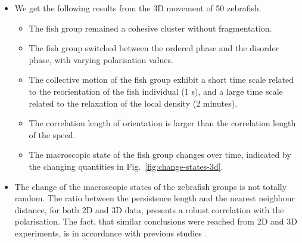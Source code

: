 \documentclass[11pt,twoside]{report}
\begin{document}
\begin{adjustwidth}{-5cm}{0cm}
\begin{tcolorbox}[
fonttitle=\sffamily\Large,
right=0.05\linewidth,
title=Summary of Chapter~5
]
\begin{itemize}
\begin{itemize}
		\item The macroscopic state of the fish group changes over time, indicated by the changing quantities in Fig.~\ref{fig:change-states-2d}.
	\end{itemize}
	\item  We get the following results from the 3D movement of 50 zebrafish.
	\begin{itemize}
		\item The fish group remained a cohesive cluster without fragmentation.
		\item The fish group switched between the ordered phase and the disorder phase, with varying polarisation values.
		\item The collective motion of the fish group exhibit a short time scale related to the reorientation of the fish individual (1 s), and a large time scale related to the relaxation of the local density (2 minutes).
		\item The correlation length of orientation is larger than the correlation length of the speed.
		\item The macroscopic state of the fish group changes over time, indicated by the changing quantities in Fig.~\ref{fig:change-states-3d}.
	\end{itemize}
	\item The change of the macroscopic states of the zebrafish groups is not totally random. The ratio between the persistence length and the nearest neighbour distance, for both 2D and 3D data, presents a robust correlation with the polarisation. The fact, that similar conclusions were reached from 2D and 3D experiments, is in accordance with previous studies \cite{watts2017, romenskyy2020}.
\end{itemize}
\end{tcolorbox}
\end{adjustwidth}
\end{document}
